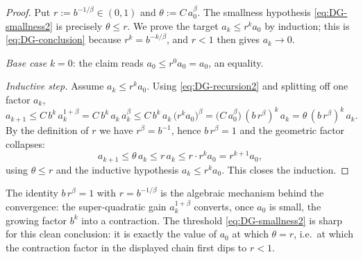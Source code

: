 \begin{proof}
Put $r:=b^{-1/\beta}\in(0,1)$ and $\theta:=C\,a_0^{\beta}$.
The smallness hypothesis \eqref{eq:DG-smallness2} is precisely
$\theta\le r$.
We prove the target $a_k\le r^{k}a_0$ by induction; this is
\eqref{eq:DG-conclusion} because $r^k=b^{-k/\beta}$, and $r<1$ then gives
$a_k\to0$.

\emph{Base case} $k=0$: the claim reads $a_0\le r^0a_0=a_0$, an equality.

\emph{Inductive step.} Assume $a_k\le r^{k}a_0$. Using
\eqref{eq:DG-recursion2} and splitting off one factor $a_k$,
\[
   a_{k+1}\le C\,b^{k}\,a_k^{1+\beta}
          =C\,b^{k}\,a_k\,a_k^{\beta}
          \le C\,b^{k}\,a_k\,\bigl(r^{k}a_0\bigr)^{\beta}
          =\bigl(C\,a_0^{\beta}\bigr)\,(b\,r^{\beta})^{k}\,a_k
          =\theta\,(b\,r^{\beta})^{k}\,a_k .
\]
By the definition of $r$ we have $r^{\beta}=b^{-1}$, hence $b\,r^{\beta}=1$
and the geometric factor collapses:
\[
   a_{k+1}\le\theta\,a_k\le r\,a_k\le r\cdot r^{k}a_0=r^{k+1}a_0,
\]
using $\theta\le r$ and the inductive hypothesis $a_k\le r^k a_0$.
This closes the induction.
\end{proof}

\begin{remark}
The identity $b\,r^{\beta}=1$ with $r=b^{-1/\beta}$ is the algebraic
mechanism behind the convergence: the super-quadratic gain
$a_k^{1+\beta}$ converts, once $a_0$ is small, the growing factor $b^k$
into a contraction. The threshold \eqref{eq:DG-smallness2} is sharp for
this clean conclusion: it is exactly the value of $a_0$ at which
$\theta=r$, i.e.\ at which the contraction factor in the displayed chain
first dips to $r<1$.
\end{remark}


